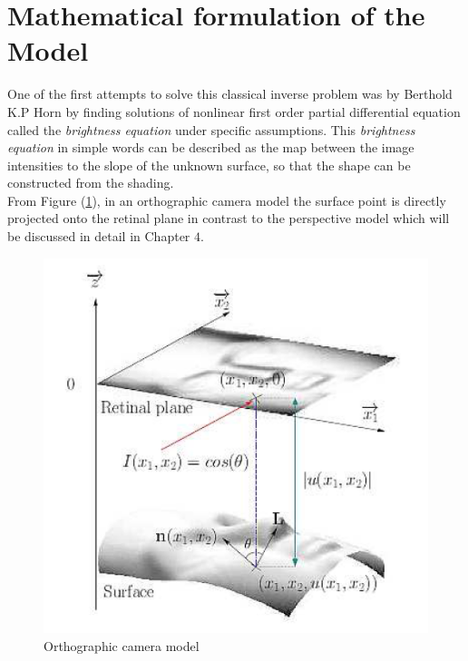 
\section{Mathematical formulation of the Model}
One of the first attempts to solve this classical inverse problem was by Berthold K.P Horn by finding solutions of nonlinear first order partial differential equation called the \emph{brightness equation} under specific assumptions. This \emph{brightness equation} in simple words can be described as the map between the image intensities to the slope of the unknown surface, so that the shape can be constructed from the shading.\\

\noindent From Figure (\ref{fig:5}), in an orthographic camera model the surface point is directly projected onto the retinal plane in contrast to the perspective model which will be discussed in detail in Chapter $4$.\\

  \begin{figure}[h!]
  	\centering
  	\includegraphics[scale = 0.3]{Images/orthographic_model.png}
  	\caption{Orthographic camera model}
  	\label{fig:5}
  \end{figure}
\pagebreak

